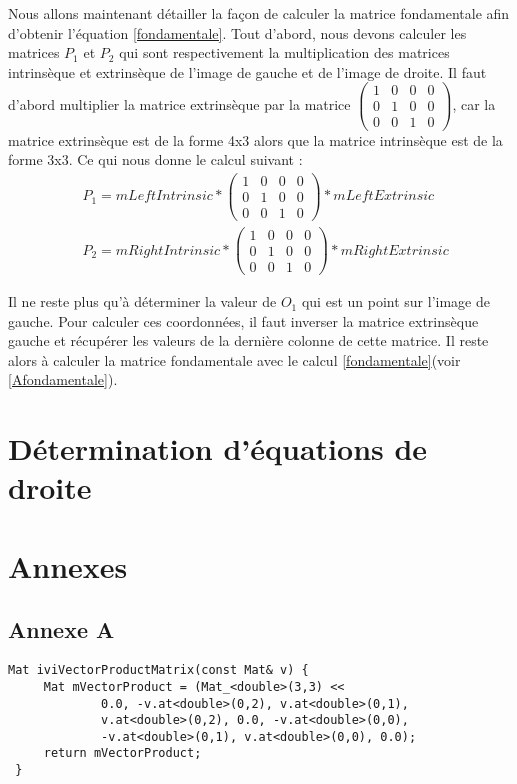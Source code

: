 \documentclass[a4paper,10pt]{article}
\begin{document}
Nous allons maintenant détailler la façon de calculer la matrice fondamentale afin
d'obtenir l'équation \eqref{fondamentale}. Tout d'abord, nous devons calculer
les matrices $P_1$ et $P_2$ qui sont respectivement la multiplication des matrices
intrinsèque et extrinsèque de l'image de gauche et de l'image de droite. Il faut
d'abord multiplier la matrice extrinsèque par la matrice $\begin{pmatrix} 1&0&0&0\\0&1&0&0\\0&0&1&0\end{pmatrix}$,
car la matrice extrinsèque est de la forme 4x3 alors que la matrice intrinsèque est de la forme
3x3. Ce qui nous donne le calcul suivant :
\begin{align}
 &P_1 = mLeftIntrinsic * \begin{pmatrix} 1&0&0&0\\0&1&0&0\\0&0&1&0\end{pmatrix} * mLeftExtrinsic\\
 &P_2 = mRightIntrinsic * \begin{pmatrix} 1&0&0&0\\0&1&0&0\\0&0&1&0\end{pmatrix} * mRightExtrinsic
 \label{matriceP}
\end{align}

Il ne reste plus qu'à déterminer la valeur de $O_1$ qui est un point sur l'image de gauche.
Pour calculer ces coordonnées, il faut inverser la matrice extrinsèque gauche et récupérer
les valeurs de la dernière colonne de cette matrice. Il reste alors à calculer la matrice
fondamentale avec le calcul \eqref{fondamentale}(voir \ref{Afondamentale}).

\section{Détermination d'équations de droite}


\section{Annexes}
\subsection{Annexe A}
\label{AproduitVector}
\begin{lstlisting}[caption=Calcul produit vectoriel]
 Mat iviVectorProductMatrix(const Mat& v) {
     Mat mVectorProduct = (Mat_<double>(3,3) <<
             0.0, -v.at<double>(0,2), v.at<double>(0,1),
             v.at<double>(0,2), 0.0, -v.at<double>(0,0),
             -v.at<double>(0,1), v.at<double>(0,0), 0.0);
     return mVectorProduct;
 }
\end{lstlisting}
\end{document}
